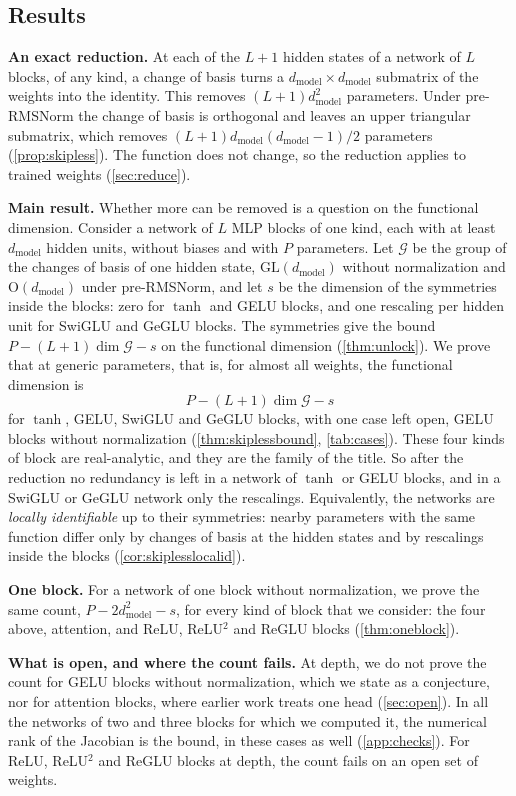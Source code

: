 \documentclass[10pt]{article}
\theoremstyle{definition}
\theoremstyle{remark}
\newcommand{\dm}{d_{\mathrm{model}}}
\newcommand{\GL}{\mathrm{GL}}
\newcommand{\Ort}{\mathrm{O}}
\newcommand{\G}{\mathcal{G}}
\newcommand{\para}[1]{\smallskip\noindent\textbf{#1}\hspace{0.5em}}
\begin{document}
\subsection{Results}\label{sec:results}

\para{An exact reduction.} At each of the $L+1$ hidden states of a network of $L$ blocks, of any kind, a change of basis turns a $\dm\times\dm$ submatrix of the weights into the identity. This removes $(L+1)\dm^2$ parameters. Under pre-RMSNorm the change of basis is orthogonal and leaves an upper triangular submatrix, which removes $(L+1)\dm(\dm-1)/2$ parameters (\cref{prop:skipless}). The function does not change, so the reduction applies to trained weights (\cref{sec:reduce}).

\para{Main result.} Whether more can be removed is a question on the functional dimension. Consider a network of $L$ MLP blocks of one kind, each with at least $\dm$ hidden units, without biases and with $P$ parameters. Let $\G$ be the group of the changes of basis of one hidden state, $\GL(\dm)$ without normalization and $\Ort(\dm)$ under pre-RMSNorm, and let $s$ be the dimension of the symmetries inside the blocks: zero for $\tanh$ and GELU blocks, and one rescaling per hidden unit for SwiGLU and GeGLU blocks. The symmetries give the bound $P - (L+1)\dim\G - s$ on the functional dimension (\cref{thm:unlock}). We prove that at generic parameters, that is, for almost all weights, the functional dimension is
\[
P - (L+1)\dim\G - s
\]
for $\tanh$, GELU, SwiGLU and GeGLU blocks, with one case left open, GELU blocks without normalization (\cref{thm:skiplessbound}, \cref{tab:cases}). These four kinds of block are real-analytic, and they are the family of the title. So after the reduction no redundancy is left in a network of $\tanh$ or GELU blocks, and in a SwiGLU or GeGLU network only the rescalings. Equivalently, the networks are \emph{locally identifiable} up to their symmetries: nearby parameters with the same function differ only by changes of basis at the hidden states and by rescalings inside the blocks (\cref{cor:skiplesslocalid}).

\para{One block.} For a network of one block without normalization, we prove the same count, $P - 2\dm^2 - s$, for every kind of block that we consider: the four above, attention, and ReLU, ReLU$^2$ and ReGLU blocks (\cref{thm:oneblock}).

\para{What is open, and where the count fails.} At depth, we do not prove the count for GELU blocks without normalization, which we state as a conjecture, nor for attention blocks, where earlier work treats one head (\cref{sec:open}). In all the networks of two and three blocks for which we computed it, the numerical rank of the Jacobian is the bound, in these cases as well (\cref{app:checks}). For ReLU, ReLU$^2$ and ReGLU blocks at depth, the count fails on an open set of weights.
\end{document}
